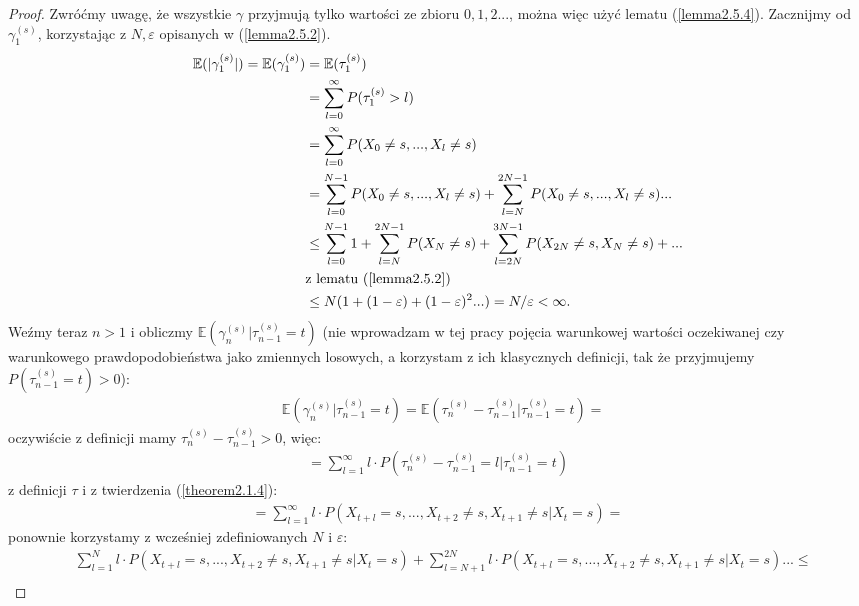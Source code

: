 \documentclass[a4paper]{article}
\theoremstyle{defn}
\theoremstyle{theorem}
\theoremstyle{lemma}
\theoremstyle{cor}
\theoremstyle{fact}
\begin{document}
\begin{proof}
Zwróćmy uwagę, że wszystkie $\gamma$ przyjmują tylko wartości ze zbioru $0,1,2...$, można więc użyć lematu (\ref{lemma2.5.4}). Zacznijmy od $\gamma_1^{(s)}$, korzystając z $N, \varepsilon$ opisanych w (\ref{lemma2.5.2}).
\begin{align*}
    \mathbb{E}(|\gamma_1^{(s)}|) = \mathbb{E}(\gamma_1^{(s)}) &= \mathbb{E}(\tau_1^{(s)})\\
    &= \sum\limits_{l = 0}^{\infty} P(\tau_1^{(s)} > l) \\
    &= \sum\limits_{l = 0}^{\infty} P(X_0 \neq s,..., X_l \neq s) \\
    &= \sum\limits_{l = 0}^{N-1} P(X_0 \neq s,..., X_l \neq s) + \sum\limits_{l = N}^{2N - 1} P(X_0 \neq s,..., X_l \neq s) ...\\
    &\leq \sum\limits_{l = 0}^{N-1} 1 + \sum\limits_{l = N}^{2N - 1} P(X_N \neq s) + \sum\limits_{l = 2N}^{3N - 1} P(X_{2N} \neq s, X_{N} \neq s)+...\\
    &\text{z lematu (\ref{lemma2.5.2})}\\
    &\leq N(1 + (1-\varepsilon) + (1 - \varepsilon)^2 ...) = N/\varepsilon < \infty.
\end{align*}
Weźmy teraz $n>1$ i obliczmy $\mathbb{E}(\gamma^{(s)}_n|\tau^{(s)}_{n-1} = t)$ (nie wprowadzam w tej pracy pojęcia warunkowej wartości oczekiwanej czy warunkowego prawdopodobieństwa jako zmiennych losowych, a korzystam z ich klasycznych definicji, tak że przyjmujemy $P(\tau^{(s)}_{n-1} = t) > 0$):
\begin{align*}
    &\mathbb{E}(\gamma^{(s)}_n|\tau^{(s)}_{n-1} = t) = \mathbb{E}(\tau^{(s)}_{n}-\tau^{(s)}_{n-1}|\tau^{(s)}_{n-1} = t) =
\end{align*}
oczywiście z definicji mamy $\tau^{(s)}_{n}-\tau^{(s)}_{n-1} > 0$, więc:
\begin{align*}
    =\sum\limits_{l = 1}^{\infty} l\cdot P(\tau^{(s)}_{n}-\tau^{(s)}_{n-1} = l|\tau^{(s)}_{n-1} = t)
\end{align*}
z definicji $\tau$ i z twierdzenia (\ref{theorem2.1.4}):
\begin{align*}
    =\sum\limits_{l = 1}^{\infty} l\cdot P(X_{t+l} = s, ..., X_{t+2} \neq s, X_{t+1} \neq s| X_t = s) =
\end{align*}
ponownie korzystamy z wcześniej zdefiniowanych $N$ i $\varepsilon$:
\begin{align*}
    &\sum\limits_{l = 1}^{N} l \cdot P(X_{t+l} = s, ..., X_{t+2} \neq s, X_{t+1} \neq s| X_t = s) + \sum\limits_{l = N+1}^{2N} l \cdot P(X_{t+l} = s, ..., X_{t+2} \neq s, X_{t+1} \neq s| X_t = s)...\leq\\

\end{align*}
\end{proof}
\end{document}
